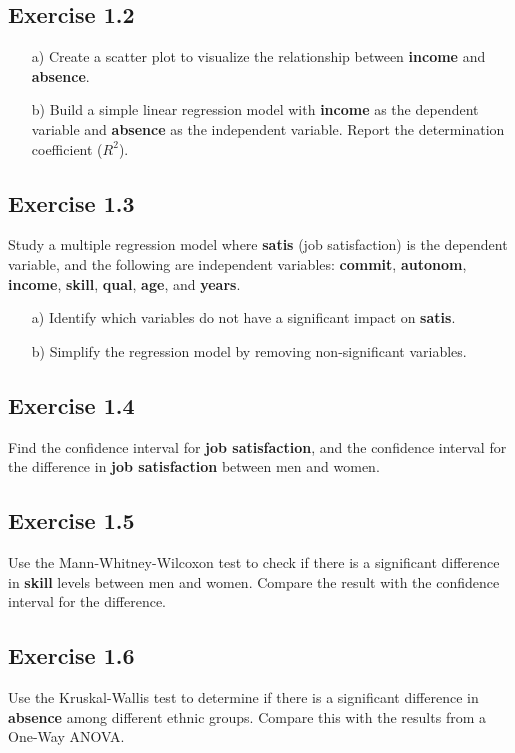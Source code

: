\documentclass[a4paper,12pt]{article}
\begin{document}
\subsection*{Exercise 1.2}
\begin{enumerate}
    \item[a)] Create a scatter plot to visualize the relationship between \textbf{income} and \textbf{absence}.
    \item[b)] Build a simple linear regression model with \textbf{income} as the dependent variable and \textbf{absence} as the independent variable. Report the determination coefficient ($R^2$).
\end{enumerate}

\subsection*{Exercise 1.3}
Study a multiple regression model where \textbf{satis} (job satisfaction) is the dependent variable, and the following are independent variables: \textbf{commit}, \textbf{autonom}, \textbf{income}, \textbf{skill}, \textbf{qual}, \textbf{age}, and \textbf{years}.
\begin{enumerate}
    \item[a)] Identify which variables do not have a significant impact on \textbf{satis}.
    \item[b)] Simplify the regression model by removing non-significant variables.
\end{enumerate}

\subsection*{Exercise 1.4}
Find the confidence interval for \textbf{job satisfaction}, and the confidence interval for the difference in \textbf{job satisfaction} between men and women.

\subsection*{Exercise 1.5}
Use the Mann-Whitney-Wilcoxon test to check if there is a significant difference in \textbf{skill} levels between men and women. Compare the result with the confidence interval for the difference.

\subsection*{Exercise 1.6}
Use the Kruskal-Wallis test to determine if there is a significant difference in \textbf{absence} among different ethnic groups. Compare this with the results from a One-Way ANOVA.
\end{document}
